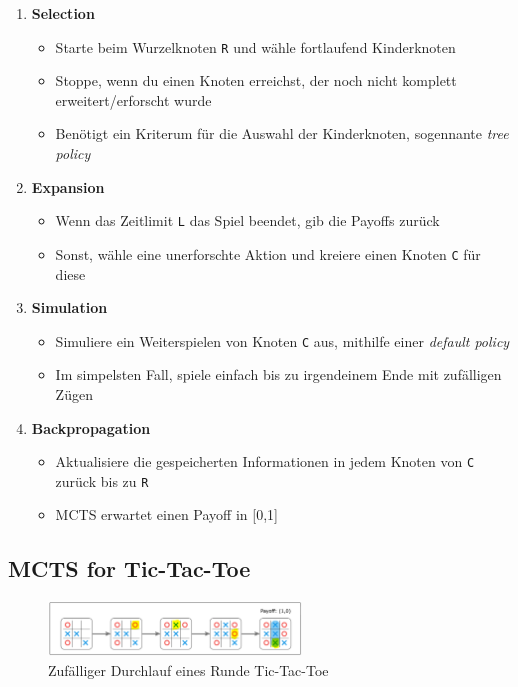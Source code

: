 \documentclass[a4paper]{article}
\begin{document}
		\begin{enumerate}
			\item \textbf{Selection}
				\begin{itemize}
					\item Starte beim Wurzelknoten \texttt{R} und wähle fortlaufend Kinderknoten
					\item Stoppe, wenn du einen Knoten erreichst, der noch nicht komplett erweitert/erforscht wurde
					\item Benötigt ein Kriterum für die Auswahl der Kinderknoten, sogennante \textit{tree policy}
				\end{itemize}
			\item \textbf{Expansion}
				\begin{itemize}
					\item Wenn das Zeitlimit \texttt{L} das Spiel beendet, gib die Payoffs zurück
					\item Sonst, wähle eine unerforschte Aktion und kreiere einen Knoten \texttt{C} für diese
				\end{itemize}
			\item \textbf{Simulation}
				\begin{itemize}
					\item Simuliere ein Weiterspielen von Knoten \texttt{C} aus, mithilfe einer \textit{default policy}
					\item Im simpelsten Fall, spiele einfach bis zu irgendeinem Ende mit zufälligen Zügen
				\end{itemize}
			\item \textbf{Backpropagation}
				\begin{itemize}
					\item Aktualisiere die gespeicherten Informationen in jedem Knoten von \texttt{C} zurück bis zu \texttt{R}
					\item MCTS erwartet einen Payoff in [0,1]
				\end{itemize}
		\end{enumerate}
	
		\subsection{MCTS for Tic-Tac-Toe}
		
		\begin{figure}[htb!]
			\centering
			\includegraphics[width=0.6\textwidth]{img/02_mcts/random_ttt.png}
			\caption{Zufälliger Durchlauf eines Runde Tic-Tac-Toe}
			\label{fig:02_mcts_random_tictactoe}
		\end{figure}
	
\end{document}
